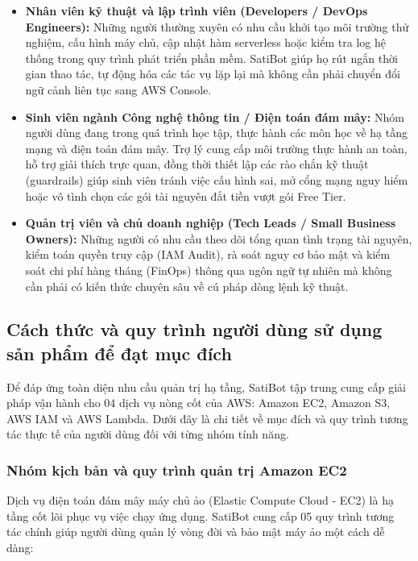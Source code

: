 \documentclass[a4paper,12pt]{article}
\begin{document}
\begin{itemize}
  \item \textbf{Nhân viên kỹ thuật và lập trình viên (Developers / DevOps Engineers):} Những người thường xuyên có nhu cầu khởi tạo môi trường thử nghiệm, cấu hình máy chủ, cập nhật hàm serverless hoặc kiểm tra log hệ thống trong quy trình phát triển phần mềm. SatiBot giúp họ rút ngắn thời gian thao tác, tự động hóa các tác vụ lặp lại mà không cần phải chuyển đổi ngữ cảnh liên tục sang AWS Console.
  \item \textbf{Sinh viên ngành Công nghệ thông tin / Điện toán đám mây:} Nhóm người dùng đang trong quá trình học tập, thực hành các môn học về hạ tầng mạng và điện toán đám mây. Trợ lý cung cấp môi trường thực hành an toàn, hỗ trợ giải thích trực quan, đồng thời thiết lập các rào chắn kỹ thuật (guardrails) giúp sinh viên tránh việc cấu hình sai, mở cổng mạng nguy hiểm hoặc vô tình chọn các gói tài nguyên đắt tiền vượt gói Free Tier.
  \item \textbf{Quản trị viên và chủ doanh nghiệp (Tech Leads / Small Business Owners):} Những người có nhu cầu theo dõi tổng quan tình trạng tài nguyên, kiểm toán quyền truy cập (IAM Audit), rà soát nguy cơ bảo mật và kiểm soát chi phí hàng tháng (FinOps) thông qua ngôn ngữ tự nhiên mà không cần phải có kiến thức chuyên sâu về cú pháp dòng lệnh kỹ thuật.
\end{itemize}

\subsection{Cách thức và quy trình người dùng sử dụng sản phẩm để đạt mục đích}

Để đáp ứng toàn diện nhu cầu quản trị hạ tầng, SatiBot tập trung cung cấp giải pháp vận hành cho 04 dịch vụ nòng cốt của AWS: Amazon EC2, Amazon S3, AWS IAM và AWS Lambda. Dưới đây là chi tiết về mục đích và quy trình tương tác thực tế của người dùng đối với từng nhóm tính năng.

\subsubsection{Nhóm kịch bản và quy trình quản trị Amazon EC2}

Dịch vụ điện toán đám mây máy chủ ảo (Elastic Compute Cloud - EC2) là hạ tầng cốt lõi phục vụ việc chạy ứng dụng. SatiBot cung cấp 05 quy trình tương tác chính giúp người dùng quản lý vòng đời và bảo mật máy ảo một cách dễ dàng:
\end{document}
